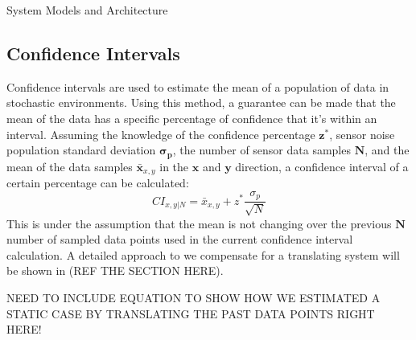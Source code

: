 \begin{section}{System Models and Architecture}
 \subsection{Confidence Intervals}

Confidence intervals are used to estimate the mean of a population of data in stochastic environments. Using this method, a guarantee can be made that the mean of the data has a specific percentage of confidence that it's within an interval. Assuming the knowledge of the confidence percentage $ \bm{z^{*}} $, sensor noise population standard deviation $ \bm{\sigma_p} $, the number of sensor data samples $ \bm{N} $, and the mean of the data samples $ \bm{\bar{x}}_{x,y} $ in the $\bm{x}$ and $\bm{y}$ direction, a confidence interval of a certain percentage can be calculated: 
 	\begin{equation}
		CI_{x,y|N} = \bar{x}_{x,y} + z^{*}\frac{\sigma_p}{\sqrt{N}}
	\end{equation}
This is under the assumption that the mean is not changing over the previous $\bm{N}$ number of sampled data points used in the current confidence interval calculation. A detailed approach to we compensate for a translating system will be shown in (REF THE SECTION HERE).


NEED TO INCLUDE EQUATION TO SHOW HOW WE ESTIMATED A STATIC CASE BY TRANSLATING THE PAST DATA POINTS RIGHT HERE!























\end{section}